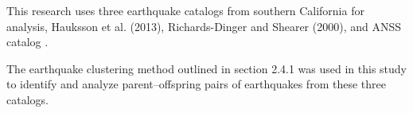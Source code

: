 \documentclass[12pt]{article} %
\theoremstyle{plain}
\begin{document}
	This research uses three earthquake catalogs from southern California for analysis, Hauksson et al. (2013), Richards-Dinger and Shearer (2000), and ANSS catalog . 
	
	The earthquake clustering method outlined in section 2.4.1 was used in this study to identify and analyze parent–offspring pairs of earthquakes from these three catalogs. %
	
\end{document}
